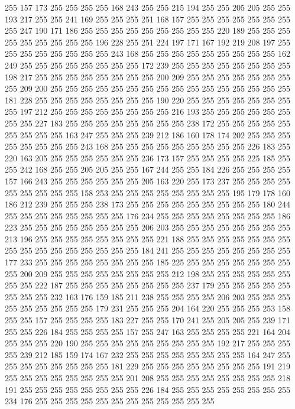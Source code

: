 255 157 173 255 255 255 255 168 243 255 255 215 194 255 255 205 205 255 255 193
217 255 255 241 169 255 255 255 251 168 157 255 255 255 255 255 255 255 255 247
190 171 186 255 255 255 255 255 255 255 255 255 220 189 255 255 255 255 255 255
255 255 255 196 228 255 251 224 197 171 167 192 219 208 197 255 255 255 255 255
255 255 255 243 168 255 255 255 255 255 255 255 255 255 162 249 255 255 255 255
255 255 255 255 172 239 255 255 255 255 255 255 255 255 198 217 255 255 255 255
255 255 255 255 200 209 255 255 255 255 255 255 255 255 209 200 255 255 255 255
255 255 255 255 255 255 255 255 255 255 255 255 181 228 255 255 255 255 255 255
255 255 190 220 255 255 255 255 255 255 255 255 197 212 255 255 255 255 255 255
255 255 216 193 255 255 255 255 255 255 255 255 227 183 255 255 255 255 255 255
255 255 238 172 255 255 255 255 255 255 255 255 255 163 247 255 255 255 239 212
186 160 178 174 202 255 255 255 255 255 255 255 255 243 168 255 255 255 255 255
255 255 255 255 226 183 255 220 163 205 255 255 255 255 255 255 236 173 157 255
255 255 255 225 185 255 255 242 168 255 255 205 205 255 255 167 244 255 255 184
226 255 255 255 255 157 166 243 255 255 255 255 255 255 205 163 220 255 173 237
255 255 255 255 255 255 255 255 255 158 253 255 255 255 255 255 255 255 255 195
179 178 160 186 212 239 255 255 255 238 173 255 255 255 255 255 255 255 255 255
180 244 255 255 255 255 255 255 255 255 176 234 255 255 255 255 255 255 255 255
186 223 255 255 255 255 255 255 255 255 206 203 255 255 255 255 255 255 255 255
213 196 255 255 255 255 255 255 255 255 221 188 255 255 255 255 255 255 255 255
255 255 255 255 255 255 255 255 184 241 255 255 255 255 255 255 255 255 177 233
255 255 255 255 255 255 255 255 185 225 255 255 255 255 255 255 255 255 200 209
255 255 255 255 255 255 255 255 212 198 255 255 255 255 255 255 255 255 222 187
255 255 255 255 255 255 255 255 237 179 255 255 255 255 255 255 255 255 232 163
176 159 185 211 238 255 255 255 255 206 203 255 255 255 255 255 255 255 255 255
179 231 255 255 255 204 164 220 255 255 255 253 158 255 255 157 255 255 255 255
183 227 255 255 170 241 255 205 205 255 239 171 255 255 226 184 255 255 255 255
157 255 247 163 255 255 255 255 221 164 204 255 255 255 220 190 255 255 255 255
255 255 255 255 255 192 217 255 255 255 255 239 212 185 159 174 167 232 255 255
255 255 255 255 255 255 164 247 255 255 255 255 255 255 255 255 181 229 255 255
255 255 255 255 255 255 191 219 255 255 255 255 255 255 255 255 201 208 255 255
255 255 255 255 255 255 218 191 255 255 255 255 255 255 255 255 226 184 255 255
255 255 255 255 255 255 234 176 255 255 255 255 255 255 255 255 255 255 255 255
